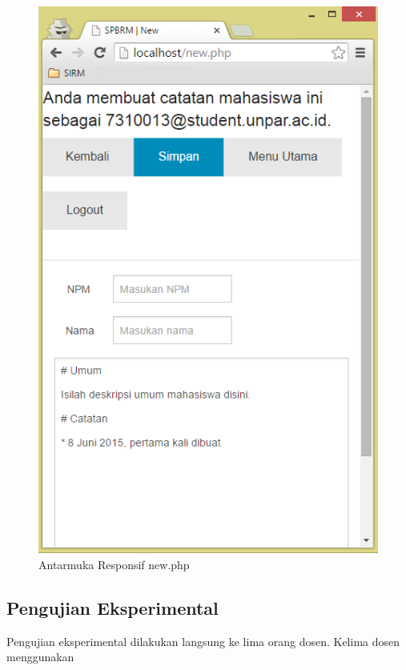 \begin{figure}[H]
\centering
\includegraphics[scale=0.5]{Gambar/pengujian19.png}
\caption[Antarmuka Responsif new.php]{Antarmuka Responsif new.php} 
\label{fig:responsifnew}
\end{figure}

\subsection{Pengujian Eksperimental}
\label{sec:pengujianeksperimantal}

Pengujian eksperimental dilakukan langsung ke lima orang dosen. Kelima dosen menggunakan 